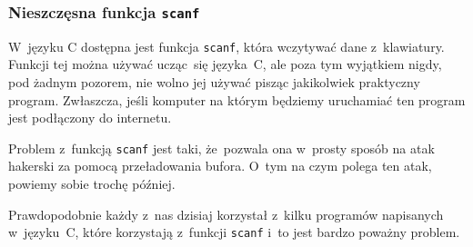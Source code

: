 \documentclass[10pt,t]{beamer}
\begin{document}
\begin{frame}
  \frametitle{Nieszczęsna funkcja \texttt{scanf}}


  W~języku C dostępna jest funkcja \texttt{scanf}, która wczytywać dane
  z~klawiatury. Funkcji tej można używać ucząc~się języka~C, ale poza
  tym wyjątkiem \alert{nigdy}, \alert{pod żadnym pozorem}, \alert{nie wolno}
  jej używać pisząc jakikolwiek praktyczny program. Zwłaszcza, jeśli komputer
  na którym będziemy uruchamiać ten program jest podłączony do internetu.

  Problem z~funkcją \texttt{scanf} jest taki, że~pozwala ona w~prosty sposób
  na atak hakerski za pomocą przeładowania bufora. O~tym na czym polega
  ten atak, powiemy sobie trochę później.

  Prawdopodobnie każdy z~nas dzisiaj korzystał z~kilku programów napisanych
  w~języku~C, które korzystają z~funkcji \texttt{scanf} i~to jest bardzo
  poważny \alert{problem}.

\end{frame}





















































\printbibliography





\end{document}
